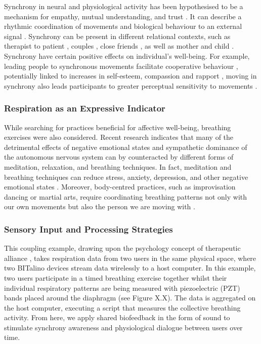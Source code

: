 Synchrony in neural and physiological activity has been hypothesised to be a mechanism for empathy, mutual understanding, and trust \cite{wallot_beyond_2016}. It can describe a rhythmic coordination of movements and biological behaviour to an external signal \cite{koole_synchrony_2016}. Synchrony can be present in different relational contexts, such as therapist to patient \cite{koole_synchrony_2016}, couples \cite{karvonen_sympathetic_2016}, close friends \cite{miles_birds_2011}, as well as mother and child \cite{butler_emotional_2013}. Synchrony have certain positive effects on individual’s well-being. For example, leading people to synchronous movements facilitate cooperative behaviour \cite{kirschner_joint_2010}, potentially linked to increases in self-esteem, compassion and rapport \cite{lumsden_sync_2014, fujiwara_rhythmic_2020}, moving in synchrony also leads participants to greater perceptual sensitivity to movements \cite{zamm_endogenous_2016}.

\subsubsection*{Respiration as an Expressive Indicator}

While searching for practices beneficial for affective well-being, breathing exercises were also considered. Recent research indicates that many of the detrimental effects of negative emotional states and sympathetic dominance of the autonomous nervous system can by counteracted by different forms of meditation, relaxation, and breathing techniques. In fact, meditation and breathing techniques can reduce stress, anxiety, depression, and other negative emotional states \cite{brown_sudarshan_2005,descilo_effects_2010,regulation_2015}. Moreover, body-centred practices, such as improvisation dancing or martial arts, require coordinating breathing patterns not only with our own movements but also the person we are moving with \cite{codrons_spontaneous_2014}. 

\subsubsection*{Sensory Input and Processing Strategies}

This coupling example, drawing upon the psychology concept of therapeutic alliance \cite{koole_synchrony_2016}, takes respiration data from two users in the same physical space, where two BITalino devices stream data wirelessly to a host computer. In this example, two users participate in a timed breathing exercise together whilst their individual respiratory patterns are being measured with piezoelectric (PZT) bands placed around the diaphragm (see Figure X.X). The data is aggregated on the host computer, executing a script that measures the collective breathing activity. From here, we apply shared biofeedback in the form of sound to stimulate synchrony awareness and physiological dialogue between users over time.

